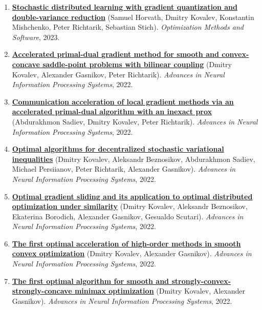 \begin{enumerate}
\item
\textbf{\href{https://www.tandfonline.com/doi/abs/10.1080/10556788.2022.2117355}{Stochastic distributed learning with gradient quantization and double-variance reduction}} (Samuel Horvath, Dmitry Kovalev, Konstantin Mishchenko, Peter Richtarik, Sebastian Stich). \textit{Optimization Methods and Software}, 2023.
\item
\textbf{\href{https://proceedings.neurips.cc/paper_files/paper/2022/hash/883f66687a521536c505f9b2fbdcbf1e-Abstract-Conference.html}{Accelerated primal-dual gradient method for smooth and convex-concave saddle-point problems with bilinear coupling}} (Dmitry Kovalev, Alexander Gasnikov, Peter Richtarik). \textit{Advances in Neural Information Processing Systems}, 2022.
\item
\textbf{\href{https://proceedings.neurips.cc/paper_files/paper/2022/hash/88c3c482430a62d35e03926a22e4b67e-Abstract-Conference.html}{Communication acceleration of local gradient methods via an accelerated primal-dual algorithm with an inexact prox}} (Abdurakhmon Sadiev, Dmitry Kovalev, Peter Richtarik). \textit{Advances in Neural Information Processing Systems}, 2022.
\item
\textbf{\href{https://proceedings.neurips.cc/paper_files/paper/2022/hash/c959bb2cb164d37569a17fa67494d69a-Abstract-Conference.html}{Optimal algorithms for decentralized stochastic variational inequalities}} (Dmitry Kovalev, Aleksandr Beznosikov, Abdurakhmon Sadiev, Michael Persiianov, Peter Richtarik, Alexander Gasnikov). \textit{Advances in Neural Information Processing Systems}, 2022.
\item
\textbf{\href{https://proceedings.neurips.cc/paper_files/paper/2022/hash/d88f6f81e1aaf606776ffdd06fdf24ef-Abstract-Conference.html}{Optimal gradient sliding and its application to optimal distributed optimization under similarity}} (Dmitry Kovalev, Aleksandr Beznosikov, Ekaterina Borodich, Alexander Gasnikov, Gesualdo Scutari). \textit{Advances in Neural Information Processing Systems}, 2022.
\item
\textbf{\href{https://proceedings.neurips.cc/paper_files/paper/2022/hash/e56f394bbd4f0ec81393d767caa5a31b-Abstract-Conference.html}{The first optimal acceleration of high-order methods in smooth convex optimization}} (Dmitry Kovalev, Alexander Gasnikov). \textit{Advances in Neural Information Processing Systems}, 2022.
\item
\textbf{\href{https://proceedings.neurips.cc/paper_files/paper/2022/hash/5e2ed801f62102f531d109d7c6e1b62f-Abstract-Conference.html}{The first optimal algorithm for smooth and strongly-convex-strongly-concave minimax optimization}} (Dmitry Kovalev, Alexander Gasnikov). \textit{Advances in Neural Information Processing Systems}, 2022.

\end{enumerate}
